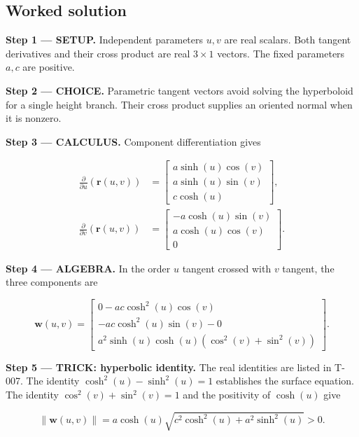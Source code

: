 \documentclass[11pt,oneside,openany]{book}
\begin{document}
\subsection*{Worked solution}

\textbf{Step 1 --- SETUP.} Independent parameters \(u,v\) are real scalars. Both tangent derivatives and their cross product are real \(3\times1\) vectors. The fixed parameters \(a,c\) are positive.

\begin{ChoiceStep}
\textbf{Step 2 --- CHOICE.} Parametric tangent vectors avoid solving the hyperboloid for a single height branch. Their cross product supplies an oriented normal when it is nonzero.

\end{ChoiceStep}
\textbf{Step 3 --- CALCULUS.} Component differentiation gives

\[
\begin{aligned}
\frac{\partial}{\partial u}\left(\mathbf r(u,v)\right)&=\begin{bmatrix}a\sinh(u)\cos(v)\\a\sinh(u)\sin(v)\\c\cosh(u)\end{bmatrix},\\
\frac{\partial}{\partial v}\left(\mathbf r(u,v)\right)&=\begin{bmatrix}-a\cosh(u)\sin(v)\\a\cosh(u)\cos(v)\\0\end{bmatrix}.
\end{aligned}
\]

\begingroup\color{AlgebraBlue}
\textbf{Step 4 --- ALGEBRA.} In the order \(u\) tangent crossed with \(v\) tangent, the three components are

\[
\mathbf w(u,v)=\begin{bmatrix}
0-ac\cosh^2(u)\cos(v)\\
-ac\cosh^2(u)\sin(v)-0\\
a^2\sinh(u)\cosh(u)(\cos^2(v)+\sin^2(v))
\end{bmatrix}.
\]

\endgroup
\begingroup\color{TrickPurple}
\textbf{Step 5 --- TRICK: hyperbolic identity.} The real identities are listed in T-007. The identity \(\cosh^2(u)-\sinh^2(u)=1\) establishes the surface equation. The identity \(\cos^2(v)+\sin^2(v)=1\) and the positivity of \(\cosh(u)\) give

\[
\|\mathbf w(u,v)\|=a\cosh(u)\sqrt{c^2\cosh^2(u)+a^2\sinh^2(u)}>0.
\]
\end{document}

